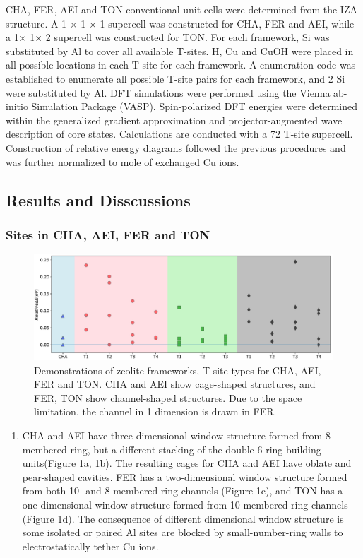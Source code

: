 \documentclass[12pt]{article}
\begin{document}
CHA, FER, AEI and TON conventional unit cells were determined from the IZA structure. A 1 $\times$ 1 $\times$ 1 supercell was constructed for CHA, FER and AEI, while a 1$\times$ 1$\times$ 2 supercell was constructed for TON. For each framework, Si was  substituted by Al to cover all available T-sites. H, Cu and CuOH were placed in all possible locations in each T-site for each framework. A enumeration code was established to enumerate all possible T-site pairs for each framework, and 2 Si were substituted by Al. DFT simulations were performed using the Vienna ab-initio Simulation Package (VASP). Spin-polarized DFT energies were determined within the generalized gradient approximation and projector-augmented wave description of core states. Calculations are conducted with a 72 T-site supercell. Construction of relative energy diagrams followed the previous procedures \cite{Paolucci2016} and was further normalized to mole of exchanged Cu ions.


\subsection*{Results and Disscussions}
\subsubsection*{Sites in CHA, AEI, FER and TON}
\begin{figure}[H]
\centering
 \includegraphics[width=6in]{./Figures/Figure-1}
 \caption{Demonstrations of zeolite frameworks, T-site types for CHA, AEI, FER and TON. CHA and AEI show cage-shaped structures, and FER, TON show channel-shaped structures. Due to the space limitation, the channel in 1 dimension is drawn in FER.}
 \label{Topologies}
\end{figure}

\begin{enumerate}
\item CHA and AEI have three-dimensional window structure formed from 8-membered-ring, but a different stacking of the double 6-ring building units(Figure 1a, 1b). The resulting cages for CHA and AEI have oblate and pear-shaped cavities. FER has a two-dimensional window structure formed from both 10- and 8-membered-ring channels (Figure 1c), and TON has a one-dimensional window structure formed from 10-membered-ring channels (Figure 1d).  The consequence of different dimensional window structure is some isolated or paired Al sites are blocked by small-number-ring walls to electrostatically tether Cu ions.
\end{enumerate}
\end{document}
